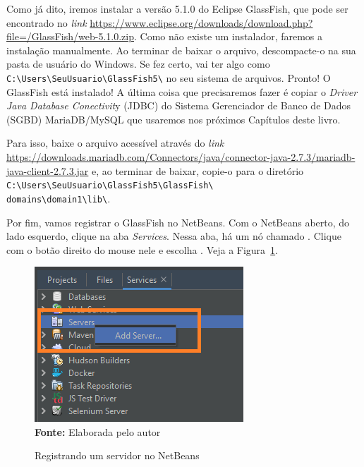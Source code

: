 Como já dito, iremos instalar a versão 5.1.0 do Eclipse GlassFish, que pode ser encontrado no \textit{link} 
\url{https://www.eclipse.org/downloads/download.php?file=/GlassFish/web-5.1.0.zip}. Como não existe um instalador, faremos a instalação manualmente. Ao terminar de baixar o arquivo, descompacte-o na sua pasta de usuário do Windows. Se fez certo, vai ter algo como \texttt{C:\textbackslash Users\textbackslash SeuUsuario\textbackslash GlassFish5\textbackslash} no seu sistema de arquivos. Pronto! O GlassFish está instalado! A última coisa que precisaremos fazer é copiar o \textit{Driver Java Database Conectivit}y (JDBC) do Sistema Gerenciador de Banco de Dados (SGBD) MariaDB/MySQL que usaremos nos próximos Capítulos deste livro.

Para isso, baixe o arquivo acessível através do \textit{link} \url{https://downloads.mariadb.com/Connectors/java/connector-java-2.7.3/mariadb-java-client-2.7.3.jar} e, ao terminar de baixar, copie-o para o diretório \texttt{C:\textbackslash Users\textbackslash SeuUsuario\textbackslash GlassFish5\textbackslash GlassFish\textbackslash\\domains\textbackslash domain1\textbackslash lib\textbackslash}.

Por fim, vamos registrar o GlassFish no NetBeans. Com o NetBeans aberto, do lado esquerdo, clique na aba \textit{Services}. Nessa aba, há um nó chamado . Clique com o botão direito do mouse nele e escolha . Veja a Figura~\ref{fig:cap01Servers}.

\FloatBarrier
\begin{figure}[!htbp]
    \centering
    \caption{Registrando um servidor no NetBeans}
    \includegraphics[scale=0.7]{imagens/cap01Servers}
    \\\textbf{Fonte:} Elaborada pelo autor
    \label{fig:cap01Servers}
\end{figure}
\FloatBarrier

